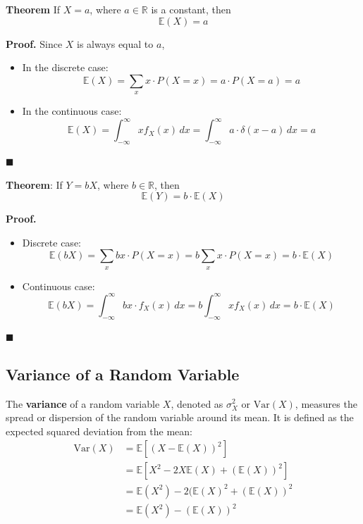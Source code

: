 \documentclass[twoside]{book}
\begin{document}
\begin{textbox}
\textbf{Theorem} If \( X = a \), where \( a \in \mathbb{R} \) is a constant, then  
\[
\mathbb{E}(X) = a
\]
\end{textbox}

\textbf{Proof.}  
Since \( X \) is always equal to \( a \),  
\begin{itemize}
  \item In the discrete case:
  \[
  \mathbb{E}(X) = \sum_{x} x \cdot P(X = x) = a \cdot P(X = a) = a
  \]
  \item In the continuous case:
  \[
  \mathbb{E}(X) = \int_{-\infty}^{\infty} x f_X(x) \, dx = \int_{-\infty}^{\infty} a \cdot \delta(x - a) \, dx = a
  \]
\end{itemize}
\hfill\(\blacksquare\)

\vspace{1em}

\begin{textbox}
\textbf{Theorem}: If \( Y = bX \), where \( b \in \mathbb{R} \), then  
\[
\mathbb{E}(Y) = b \cdot \mathbb{E}(X)
\]
\end{textbox}

\textbf{Proof.}  
\begin{itemize}
  \item Discrete case:
  \[
  \mathbb{E}(bX) = \sum_{x} b x \cdot P(X = x) = b \sum_{x} x \cdot P(X = x) = b \cdot \mathbb{E}(X)
  \]
  \item Continuous case:
  \[
  \mathbb{E}(bX) = \int_{-\infty}^{\infty} b x \cdot f_X(x) \, dx = b \int_{-\infty}^{\infty} x f_X(x) \, dx = b \cdot \mathbb{E}(X)
  \]
\end{itemize}
\hfill\(\blacksquare\)


\subsection{Variance of a Random Variable}

The \textbf{variance} of a random variable \( X \), denoted as $\sigma_X^2$ or \( \text{Var}(X) \), measures the spread or dispersion of the random variable around its mean. It is defined as the expected squared deviation from the mean:
\begin{align*}
\text{Var}(X) &= \mathbb{E}[(X - \mathbb{E}(X))^2] \\
&=\mathbb{E}\left[ X^2 - 2X\mathbb{E}(X) + (\mathbb{E}(X))^2\right]  \\
&=\mathbb{E}(X^2)- 2(\mathbb{E}(X)^2 + (\mathbb{E}(X))^2 \\
&= \mathbb{E}(X^2) - (\mathbb{E}(X))^2
\end{align*}
\end{document}
